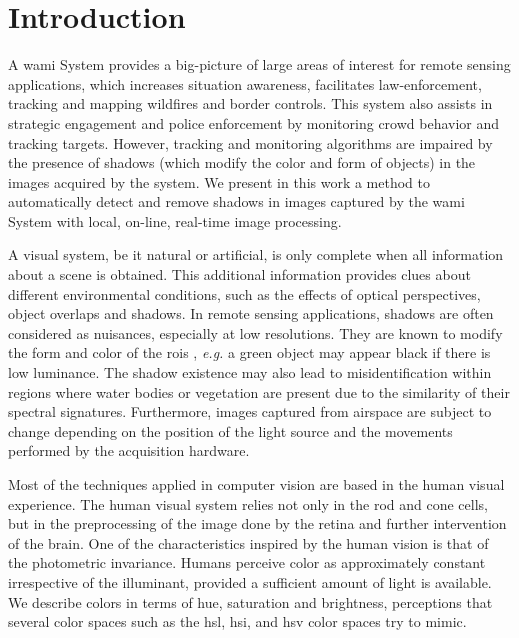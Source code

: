 \chapter{Introduction} \label{ch:intro}
A \gls{wami} System \cite{Blasch2014} provides a big-picture of large areas of interest for remote sensing applications, which increases situation awareness, facilitates law-enforcement, tracking and mapping wildfires and border controls. This system also assists in strategic engagement and police enforcement by monitoring crowd behavior and tracking targets. However, tracking and monitoring algorithms are impaired by the presence of shadows (which modify the color and form of objects) in the images acquired by the system. We present in this work a method to automatically detect and remove shadows in images captured by the \gls{wami} System with local, on-line, real-time image processing.

A visual system, be it natural or artificial, is only complete when all information about a scene is obtained. This additional information provides clues about different environmental conditions, such as the effects of optical perspectives, object overlaps and shadows. In remote sensing applications, shadows are often considered as nuisances, especially at low resolutions. They are known to modify the form and color of the \glspl{roi} \cite{pan2014}, \emph{e.g.} a green object may appear black if there is low luminance. The shadow existence may also lead to misidentification within regions where water bodies or vegetation are present due to the similarity of their spectral signatures. Furthermore, images captured from airspace are subject to change depending on the position of the light source and the movements performed by the acquisition hardware.

Most of the techniques applied in computer vision are based in the human visual experience. The human visual system relies not only in the rod and cone cells, but in the preprocessing of the image done by the retina and further intervention of the brain. One of the characteristics inspired by the human vision is that of the photometric invariance. Humans perceive color as approximately constant irrespective of the illuminant, provided a sufficient amount of light is available. We describe colors in terms of hue, saturation and brightness, perceptions that several color spaces such as the \gls{hsl}, \gls{hsi}, and \gls{hsv} color spaces try to mimic.

